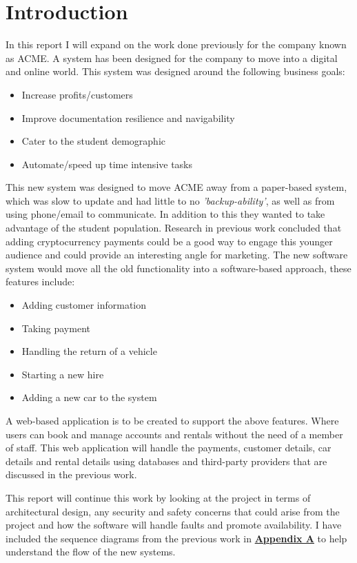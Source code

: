 \section{Introduction}

  In this report I will expand on the work done previously for the company known as ACME. A system has been designed for the company to 
  move into a digital and online world. This system was designed around the following business goals:
  \begin{itemize}
    \item Increase profits/customers
    \item Improve documentation resilience and navigability
    \item Cater to the student demographic
    \item Automate/speed up time intensive tasks
  \end{itemize}

  This new system was designed to move ACME away from a paper-based system, which was slow to update and had little to no \textit{'backup-ability'},
  as well as from using phone/email to communicate. In addition to this they wanted to take advantage of the student population. Research in 
  previous work concluded that adding cryptocurrency payments could be a good way to engage this younger audience and could provide an interesting 
  angle for marketing. The new software system would move all the old functionality into a software-based approach, these features include:

  \begin{itemize}
    \item Adding customer information
    \item Taking payment
    \item Handling the return of a vehicle
    \item Starting a new hire
    \item Adding a new car to the system
  \end{itemize}

  A web-based application is to be created to support the above features. Where users can book and manage accounts and rentals without the need of a member
  of staff. This web application will handle the payments, customer details, car details and rental details using databases and third-party providers that 
  are discussed in the previous work.

  This report will continue this work by looking at the project in terms of architectural design, any security and safety concerns that could arise from the 
  project and how the software will handle faults and promote availability. I have included the sequence diagrams from the previous work in 
  \hyperref[sec:AppendixA]{\textbf{Appendix A}} to help understand the flow of the new systems.

\newpage